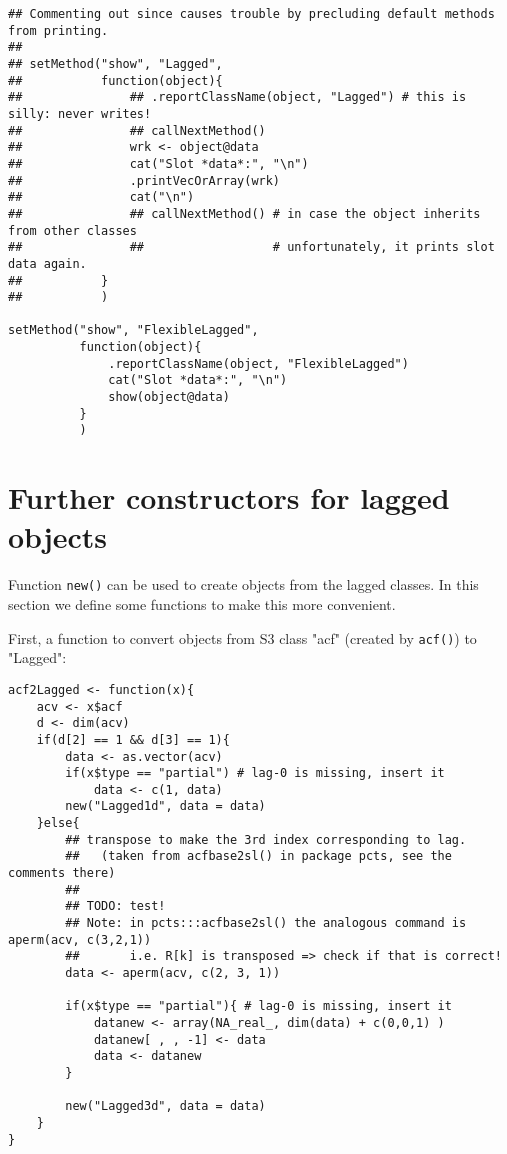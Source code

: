 \documentclass[11pt,a4paper]{article}
\begin{document}
\begin{verbatim}
## Commenting out since causes trouble by precluding default methods from printing.
##
## setMethod("show", "Lagged",
##           function(object){
##               ## .reportClassName(object, "Lagged") # this is silly: never writes!
##               ## callNextMethod()
##               wrk <- object@data
##               cat("Slot *data*:", "\n")
##               .printVecOrArray(wrk)
##               cat("\n")
##               ## callNextMethod() # in case the object inherits from other classes
##               ##                  # unfortunately, it prints slot data again.
##           }
##           )

setMethod("show", "FlexibleLagged",
          function(object){
              .reportClassName(object, "FlexibleLagged")
              cat("Slot *data*:", "\n")
              show(object@data)
          }
          )
\end{verbatim}


\section{Further constructors for lagged objects}
\label{sec:org36a85c4}

Function \texttt{new()} can be used to create objects from the lagged classes.
In this section we define some functions to make this more convenient.

First, a function to convert objects from S3 class "acf" (created by \texttt{acf()}) to "Lagged":
\begin{verbatim}
acf2Lagged <- function(x){
    acv <- x$acf
    d <- dim(acv)
    if(d[2] == 1 && d[3] == 1){
        data <- as.vector(acv)
        if(x$type == "partial") # lag-0 is missing, insert it
            data <- c(1, data)
        new("Lagged1d", data = data)
    }else{
        ## transpose to make the 3rd index corresponding to lag.
        ##   (taken from acfbase2sl() in package pcts, see the comments there)
        ##
        ## TODO: test!
        ## Note: in pcts:::acfbase2sl() the analogous command is aperm(acv, c(3,2,1))
        ##       i.e. R[k] is transposed => check if that is correct!
        data <- aperm(acv, c(2, 3, 1))

        if(x$type == "partial"){ # lag-0 is missing, insert it
            datanew <- array(NA_real_, dim(data) + c(0,0,1) )
            datanew[ , , -1] <- data
            data <- datanew
        }

        new("Lagged3d", data = data)
    }
}
\end{verbatim}
\end{document}
